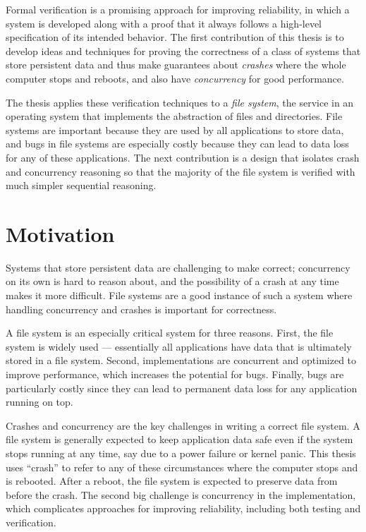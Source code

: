 Formal verification is a promising approach for improving reliability, in which
a system is developed along with a proof that it always follows a high-level
specification of its intended behavior. The first contribution of this
thesis is to develop ideas and techniques for proving the correctness of a class of
systems that store persistent data and thus make guarantees about \emph{crashes}
where the whole computer stops and reboots, and also have \emph{concurrency} for
good performance.

The thesis applies these verification techniques to a \emph{file system},
the service in an operating system that implements the abstraction of files and
directories. File systems are important because they are used by all
applications to store data, and bugs in file systems are especially costly
because they can lead to data loss for any of these applications. The next
contribution is a design that isolates crash and concurrency reasoning so that
the majority of the file system is verified with much simpler sequential
reasoning.

\section{Motivation}
\label{sec:intro:motivation}

Systems that store persistent data are challenging to make correct; concurrency
on its own is hard to reason about, and the possibility of a crash at any time
makes it more difficult. File systems are a good instance of such a system where
handling concurrency and crashes is important for correctness.

A file system is an especially critical system for
three reasons. First, the file system is widely used --- essentially all applications have
data that is ultimately stored in a file system. Second, implementations are
concurrent and optimized to improve performance, which increases the potential
for bugs. Finally, bugs are particularly costly since they can lead to permanent
data loss for any application running on top.

Crashes and
concurrency are the key challenges in writing a correct file system.
A file system is generally expected to keep application data safe
even if the system stops running at any time, say due to a power failure or
kernel panic. This thesis uses ``crash'' to refer to any of these circumstances
where the computer stops and is rebooted. After a reboot, the file system is
expected to preserve data from before the crash. The second big challenge is
concurrency in the implementation, which complicates approaches for improving
reliability, including both testing and verification.

